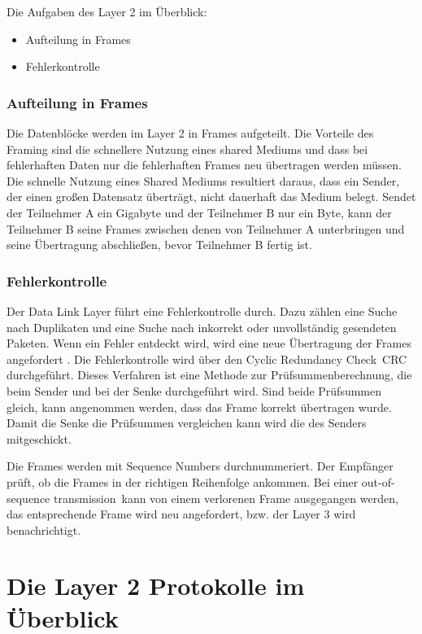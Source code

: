 \documentclass[12pt, a4paper, ngerman]{article}
\begin{document}
Die Aufgaben des Layer 2 im Überblick:
\begin{itemize}
	\item Aufteilung in Frames
	\item Fehlerkontrolle
\end{itemize} 

\subsubsection{Aufteilung in Frames}
Die Datenblöcke werden im Layer 2 in Frames aufgeteilt. Die Vorteile des Framing sind die schnellere Nutzung eines shared Mediums und dass bei fehlerhaften Daten nur die fehlerhaften Frames neu übertragen werden müssen. Die schnelle Nutzung eines Shared Mediums resultiert daraus, dass ein Sender, der einen großen Datensatz überträgt, nicht dauerhaft das Medium belegt. Sendet der Teilnehmer A ein Gigabyte und der Teilnehmer B nur ein Byte, kann der Teilnehmer B seine Frames zwischen denen von Teilnehmer A unterbringen und seine Übertragung abschließen, bevor Teilnehmer B fertig ist.
 
\subsubsection{Fehlerkontrolle}
Der Data Link Layer führt eine Fehlerkontrolle durch. Dazu zählen eine Suche nach Duplikaten und eine Suche nach inkorrekt oder unvollständig gesendeten Paketen. Wenn ein Fehler entdeckt wird, wird eine neue Übertragung der Frames angefordert \cite[S. 91]{SWB-107223570}. Die Fehlerkontrolle wird über den \glqq Cyclic Redundancy Check\grqq ~CRC durchgeführt. Dieses Verfahren ist eine Methode zur Prüf\-summen\-be\-rech\-nung, die beim Sender und bei der Senke durchgeführt wird. Sind beide Prüfsummen gleich, kann angenommen werden, dass das Frame korrekt übertragen wurde. Damit die Senke die Prüfsummen vergleichen kann wird die des Senders mitgeschickt.

Die Frames werden mit Sequence Numbers durchnummeriert. Der Empfänger prüft, ob die Frames in der richtigen Reihenfolge ankommen. Bei einer \glqq out-of-sequence transmission\grqq ~kann von einem verlorenen Frame ausgegangen werden, das entsprechende Frame wird neu angefordert, bzw. der Layer 3 wird benachrichtigt.
\section{Die Layer 2 Protokolle im Überblick}
\end{document}
